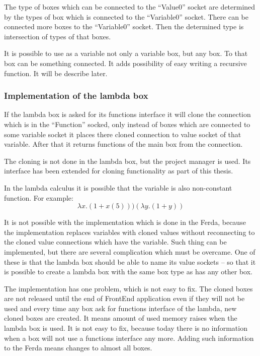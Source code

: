 \documentclass[a4paper,12pt]{book}
\begin{document}
The type of boxes which can be connected to the ``Value0'' socket are determined by the types of box which is connected to the ``Variable0'' socket. There can be connected more boxes to the ``Variable0'' socket. Then the determined type is intersection of types of that boxes.

It is possible to use as a variable not only a variable box, but any box. To that box can be something connected. It adds possibility of easy writing a recursive function. It will be describe later.   

\subsubsection{Implementation of the lambda box}
If the lambda box is asked for its functions interface it will clone the connection which is in the ``Function'' socked, only instead of boxes which are connected to some variable socket it places there cloned connection to value socket of that variable. After that it returns functions of the main box from the connection.

The cloning is not done in the lambda box, but the project manager is used. Its interface has been extended for cloning functionality as part of this thesis.

In the lambda calculus it is possible that the variable is also non-constant function. For example:
\begin{equation}
\lambda x.(1+x(5)))(\lambda y.(1+y))
\end{equation}

It is not possible with the implementation which is done in the Ferda, because the implementation replaces variables with cloned values without reconnecting to the cloned value connections which have the variable. Such thing can be implemented, but there are several complication which must be overcame. One of these is that the lambda box should be able to name its value sockets -- so that it is possible to create a lambda box with the same box type as has any other box.

The implementation has one problem, which is not easy to fix. The cloned boxes are not released until the end of FrontEnd application even if they will not be used and every time any box ask for functions interface of the lambda, new cloned boxes are created. It means amount of used memory raises when the lambda box is used. It is not easy to fix, because today there is no information when a box will not use a functions interface any more. Adding such information to the Ferda means changes to almost all boxes.
\end{document}
